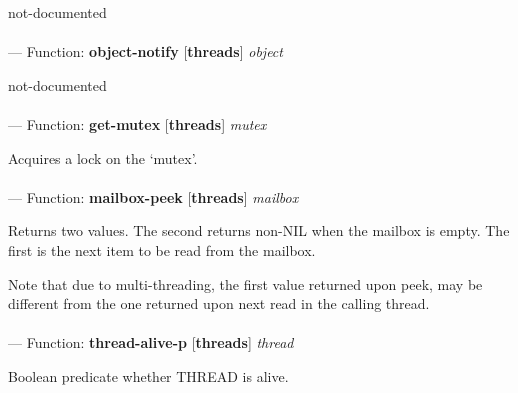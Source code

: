 \begin{adjustwidth}{5em}{5em}
not-documented
\end{adjustwidth}

\paragraph{}
\label{THREADS:OBJECT-NOTIFY}
--- Function: \textbf{object-notify} [\textbf{threads}] \textit{object}

\begin{adjustwidth}{5em}{5em}
not-documented
\end{adjustwidth}

\paragraph{}
\label{THREADS:GET-MUTEX}
--- Function: \textbf{get-mutex} [\textbf{threads}] \textit{mutex}

\begin{adjustwidth}{5em}{5em}
Acquires a lock on the `mutex'.
\end{adjustwidth}

\paragraph{}
\label{THREADS:MAILBOX-PEEK}
--- Function: \textbf{mailbox-peek} [\textbf{threads}] \textit{mailbox}

\begin{adjustwidth}{5em}{5em}
Returns two values. The second returns non-NIL when the mailbox
is empty. The first is the next item to be read from the mailbox.

Note that due to multi-threading, the first value returned upon
peek, may be different from the one returned upon next read in the
calling thread.
\end{adjustwidth}

\paragraph{}
\label{THREADS:THREAD-ALIVE-P}
--- Function: \textbf{thread-alive-p} [\textbf{threads}] \textit{thread}

\begin{adjustwidth}{5em}{5em}
Boolean predicate whether THREAD is alive.
\end{adjustwidth}

